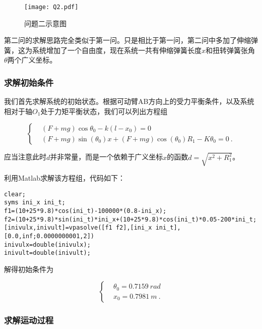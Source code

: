 \documentclass[a4paper,c5size,twoside,UTF8]{ctexart} %
\numberwithin{equation}{section}   %
\begin{document}
\begin{figure}[H]
	\centering
	\texttt{[image: Q2.pdf]}
	\caption{问题二示意图}
\end{figure}

第二问的求解思路完全类似于第一问。只是相比于第一问，第二问中多加了伸缩弹簧，这为系统增加了一个自由度，现在系统一共有伸缩弹簧长度$x$和扭转弹簧张角$\theta$两个广义坐标。


\subsubsection{求解初始条件}

我们首先求解系统的初始状态。根据可动臂AB方向上的受力平衡条件，以及系统相对于轴$O_1$处于力矩平衡状态，我们可以列出方程组

\begin{equation}
    \left\{
        \begin{aligned}
        &(F+mg) \cos\theta_0-k(l-x_0)=0 \\
        &(F+mg) \sin(\theta_0) x+(F+mg)\cos(\theta_0) R_1-K\theta_0 = 0~.
        \end{aligned}
    \right.
\end{equation}

应当注意此时$d$并非常量，而是一个依赖于广义坐标$x$的函数$d=\sqrt{x^2+R_1^2}$。

\vspace{1.9em}

利用Matlab求解该方程组，代码如下：


\begin{lstlisting}
clear;
syms ini_x ini_t;
f1=(10+25*9.8)*cos(ini_t)-100000*(0.8-ini_x);
f2=(10+25*9.8)*sin(ini_t)*ini_x+(10+25*9.8)*cos(ini_t)*0.05-200*ini_t;
[inivulx,inivult]=vpasolve([f1 f2],[ini_x ini_t],[0.0,inf;0.0000000001,2])
inivulx=double(inivulx);
inivult=double(inivult);
\end{lstlisting}


解得初始条件为

\begin{equation}
    \left\{
        \begin{aligned}
       &\theta_0=0.7159~rad \\
        &x_0=0.7981~m~.
        \end{aligned}
    \right.
\end{equation}

\subsubsection{求解运动过程}
\end{document}
